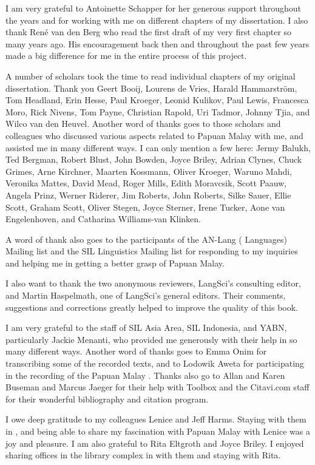 \begin{refsection}
I am very grateful to Antoinette Schapper for her generous support throughout the years and for working with me on different chapters of my dissertation. I also thank René van den Berg who read the first draft of my very first chapter so many years ago. His encouragement back then and throughout the past few years made a big difference for me in the entire process of this project.

\newpage  
\largerpage
A number of scholars took the time to read individual chapters of my original dissertation. Thank you Geert Booij, Lourens de Vries, Harald Hammarström, Tom Headland, Erin Hesse, Paul Kroeger, Leonid Kulikov, Paul Lewis, Francesca Moro, Rick Nivens, Tom Payne, Christian Rapold, Uri Tadmor, Johnny Tjia, and Wilco van den Heuvel. Another word of thanks goes to those scholars and colleagues who discussed various aspects related to Papuan Malay with me, and assisted me in many different ways. I can only mention a few here: Jermy Balukh, Ted Bergman, Robert Blust, John Bowden, Joyce Briley, Adrian Clynes, Chuck Grimes, Arne Kirchner, Maarten Kossmann, Oliver Kroeger, Waruno Mahdi, Ver\-onika Mattes, David Mead, Roger Mills, Edith Moravcsik, Scott Paauw, Angela Prinz, Werner Riderer, Jim Roberts, John Roberts, Silke Sauer, Ellie Scott, Graham Scott, Oliver Stegen, Joyce Sterner, Irene Tucker, Aone van Engelenhoven, and Catharina Williams-van Klinken.

A word of thank also goes to the participants of the AN-Lang ( Languages) Mailing list and the SIL Linguistics Mailing list for responding to my inquiries and helping me in getting a better grasp of Papuan Malay.

I also want to thank the two anonymous reviewers, LangSci’s consulting editor, and Martin Haspelmath, one of LangSci’s general editors. Their comments, suggestions and corrections greatly helped to improve the quality of this book.

I am very grateful to the staff of SIL Asia Area, SIL Indonesia, and YABN, particularly Jackie Menanti, who provided me generously with their help in so many different ways. Another word of thanks goes to Emma Onim for transcribing some of the recorded texts, and to Lodowik Aweta for participating in the recording of the Papuan Malay . Thanks also go to Allan and Karen Buseman and Marcus Jaeger for their help with Toolbox and the Citavi.com staff for their wonderful bibliography and citation program.

I owe deep gratitude to my colleagues Lenice and Jeff Harms. Staying with them in , and being able to share my fascination with Papuan Malay with Lenice was a joy and pleasure. I am also grateful to Rita Eltgroth and Joyce Briley. I enjoyed sharing offices in the library complex in  with them and staying with Rita.


\end{refsection}
